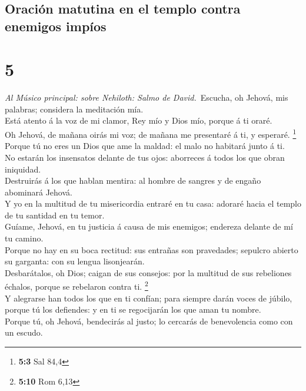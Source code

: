 \hypertarget{oraciuxf3n-matutina-en-el-templo-contra-enemigos-impuxedos}{%
\subsection{Oración matutina en el templo contra enemigos
impíos}\label{oraciuxf3n-matutina-en-el-templo-contra-enemigos-impuxedos}}

\hypertarget{section-4}{%
\section{5}\label{section-4}}

 \emph{Al Músico principal: sobre Nehiloth: Salmo de
David.}~Escucha, oh Jehová, mis palabras; considera la meditación mía.\\
 Está atento á la voz de mi clamor, Rey mío y Dios mío,
porque á ti oraré.\\
 Oh Jehová, de mañana oirás mi voz; de mañana me presentaré
á ti, y esperaré. \footnote{\textbf{5:3} Sal 84,4}\\
 Porque tú no eres un Dios que ame la maldad: el malo no
habitará junto á ti.\\
 No estarán los insensatos delante de tus ojos: aborreces á
todos los que obran iniquidad.\\
 Destruirás á los que hablan mentira: al hombre de sangres y
de engaño abominará Jehová.\\
 Y yo en la multitud de tu misericordia entraré en tu casa:
adoraré hacia el templo de tu santidad en tu temor.\\
 Guíame, Jehová, en tu justicia á causa de mis enemigos;
endereza delante de mí tu camino.\\
 Porque no hay en su boca rectitud: sus entrañas son
pravedades; sepulcro abierto su garganta: con su lengua lisonjearán.\\
 Desbarátalos, oh Dios; caigan de sus consejos: por la
multitud de sus rebeliones échalos, porque se rebelaron contra ti.
\footnote{\textbf{5:10} Rom 6,13}\\
 Y alegrarse han todos los que en ti confían; para siempre
darán voces de júbilo, porque tú los defiendes: y en ti se regocijarán
los que aman tu nombre.\\
 Porque tú, oh Jehová, bendecirás al justo; lo cercarás de
benevolencia como con un escudo.

